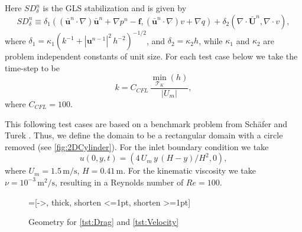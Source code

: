 Here $SD_{\delta}^n$ is the GLS stabilization and is given by
\begin{equation}
  SD_{\delta}^n \equiv
    \delta_1 (\left(\bar{\mathbf{u}}^n \cdot \nabla \right) \bar{\mathbf{u}}^n
        + \nabla p^n - \mathbf{f},
      \left(\bar{\mathbf{u}}^n \cdot \nabla \right) v + \nabla q)
      + \delta_2 (\nabla \cdot \bar{\mathbf{U}}^n, \nabla \cdot v),
  \label{eqn:NSEStabilization}
\end{equation}
where $\delta_1 = \kappa_1 (k^{-1} + |\mathbf{u}^{n-1}|^2\, h^{-2})^{-1/2}$, and
$\delta_2 = \kappa_2 h$, while $\kappa_1$ and $\kappa_2$ are problem independent
constants of unit size. For each test case below we take the time-step to be
\begin{equation*}
  k = C_{CFL}\, \frac{\min_{\mathcal{T}_K}(h)}{|U_m|},
\end{equation*}
where $C_{CFL}=100$.

This following test cases are based on a benchmark problem from Sch\"afer and
Turek \cite[Test case 2D-2]{Schaefer1996}. Thus, we define the domain to be a
rectangular domain with a circle removed (see \autoref{fig:2DCylinder}). For the
inlet boundary condition we take
\begin{equation}
    u(0,y,t) = (4\, U_m\,y\, (H - y)/H^2, 0),
    \label{eqn:2DInlet}
\end{equation}
where $U_m = 1.5\, \text{m/s}$, $H = 0.41\, \text{m}$. For the kinematic
viscosity we take $\nu = 10^{-3}\, \text{m}^2\text{/s}$, resulting in a
Reynolds number of $Re=100$.

\begin{figure}[h]
    \centering
    =[->, thick, shorten <=1pt, shorten >=1pt]
    \caption{Geometry for \autoref{tst:Drag} and \autoref{tst:Velocity}}
    \label{fig:2DCylinder}
\end{figure}

